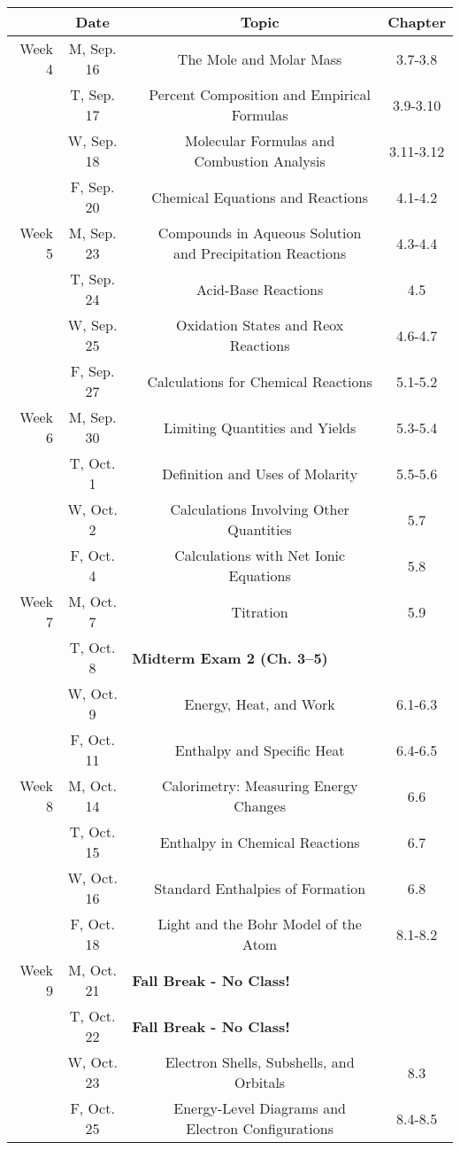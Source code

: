 \documentclass[12pt, letterpaper]{article}
\begin{document}
\noindent\hspace{-2.5em}
\begin{tabular}{rcccc}
	& Date && Topic & Chapter\\
	\midrule
	Week 4 & M, Sep. 16&& The Mole and Molar Mass & 3.7-3.8\\
	& T, Sep. 17&& Percent Composition and Empirical Formulas & 3.9-3.10\\
	& W, Sep. 18&& Molecular Formulas and Combustion Analysis & 3.11-3.12\\
	& F, Sep. 20&& Chemical Equations and Reactions & 4.1-4.2\\
	\midrule
	Week 5 & M, Sep. 23&& Compounds in Aqueous Solution and Precipitation Reactions & 4.3-4.4\\
	& T, Sep. 24&& Acid-Base Reactions & 4.5\\
	& W, Sep. 25&& Oxidation States and Reox Reactions & 4.6-4.7\\
	& F, Sep. 27&& Calculations for Chemical Reactions & 5.1-5.2\\
	\midrule
	Week 6 & M, Sep. 30&& Limiting Quantities and Yields & 5.3-5.4\\
	& T, Oct. 1&& Definition and Uses of Molarity & 5.5-5.6\\
	& W, Oct. 2&& Calculations Involving Other Quantities & 5.7\\
	& F, Oct. 4&& Calculations with Net Ionic Equations & 5.8\\
	\midrule
	Week 7 & M, Oct. 7&& Titration & 5.9\\
	& T, Oct. 8& \multicolumn{3}{l}{\textbf{Midterm Exam 2 (Ch. 3--5)}}\\
	& W, Oct. 9&& Energy, Heat, and Work & 6.1-6.3\\
	& F, Oct. 11&& Enthalpy and Specific Heat & 6.4-6.5\\
	\midrule
	Week 8 & M, Oct. 14&& Calorimetry: Measuring Energy Changes & 6.6\\
	& T, Oct. 15&& Enthalpy in Chemical Reactions & 6.7\\
	& W, Oct. 16&& Standard Enthalpies of Formation & 6.8\\
	& F, Oct. 18&& Light and the Bohr Model of the Atom & 8.1-8.2\\
	\midrule
	Week 9 & M, Oct. 21& \multicolumn{3}{l}{\textbf{Fall Break - No Class!}}\\
	& T, Oct. 22& \multicolumn{3}{l}{\textbf{Fall Break - No Class!}}\\
	& W, Oct. 23&& Electron Shells, Subshells, and Orbitals & 8.3\\
	& F, Oct. 25&& Energy-Level Diagrams and Electron Configurations & 8.4-8.5\\
\end{tabular}
\end{document}
